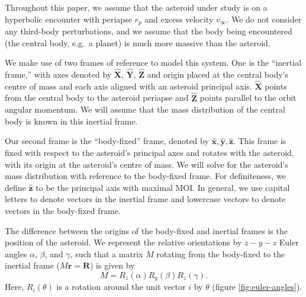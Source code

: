 \documentclass[fleqn,usenatbib]{mnras}
\newcommand{\unit}[1]{\bm{\hat{#1}}}
\begin{document}
Throughout this paper, we assume that the asteroid under study is on a hyperbolic encounter with periapse $r_p$ and excess velocity $v_\infty$. We do not consider any third-body perturbations, and we assume that the body being encountered (the central body, e.g.~a planet) is much more massive than the asteroid.

We make use of two frames of reference to model this system. One is the ``inertial frame,'' with axes denoted by $\unit{X}$, $\unit{Y}$, $\unit{Z}$ and origin placed at the central body's centre of mass and each axis aligned with an asteroid principal axis. $\unit{X}$ points from the central body to the asteroid periapse and $\unit{Z}$ points parallel to the orbit angular momentum. We will assume that the mass distribution of the central body is known in this inertial frame.

Our second frame is the ``body-fixed'' frame, denoted by $\unit{x}, \unit{y}, \unit{z}$. This frame is fixed with respect to the asteroid's principal axes and rotates with the asteroid, with its origin at the asteroid's centre of mass. We will solve for the asteroid's mass distribution with reference to the body-fixed frame. For definiteness, we define $\unit{z}$ to be the principal axis with maximal MOI. In general, we use capital letters to denote vectors in the inertial frame and lowercase vectors to denote vectors in the body-fixed frame.

The difference between the origins of the body-fixed and inertial frames is the position of the asteroid. We represent the relative orientations by $z-y-z$ Euler angles $\alpha$, $\beta$, and $\gamma$, such that a matrix $M$ rotating from the body-fixed to the inertial frame ($M\bm{r} = \bm{R}$) is given by
\begin{equation}
M = R_z(\alpha) R_y(\beta) R_z(\gamma).
\label{eqn:euler-angles}
\end{equation}
Here, $R_i(\theta)$ is a rotation around the unit vector $i$ by $\theta$ (figure \ref{fig:euler-angles}).
\end{document}
